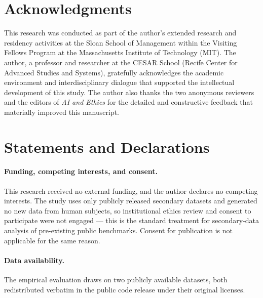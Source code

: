 \documentclass[11pt]{article}
\begin{document}
\section*{Acknowledgments}

This research was conducted as part of the author's extended research and residency activities at the Sloan School of Management within the Visiting Fellows Program at the Massachusetts Institute of Technology (MIT). The author, a professor and researcher at the CESAR School (Recife Center for Advanced Studies and Systems), gratefully acknowledges the academic environment and interdisciplinary dialogue that supported the intellectual development of this study. The author also thanks the two anonymous reviewers and the editors of \textit{AI and Ethics} for the detailed and constructive feedback that materially improved this manuscript.

\section*{Statements and Declarations}

\paragraph{Funding, competing interests, and consent.} This research received no external funding, and the author declares no competing interests. The study uses only publicly released secondary datasets and generated no new data from human subjects, so institutional ethics review and consent to participate were not engaged --- this is the standard treatment for secondary-data analysis of pre-existing public benchmarks. Consent for publication is not applicable for the same reason.

\paragraph{Data availability.} The empirical evaluation draws on two publicly available datasets, both redistributed verbatim in the public code release under their original licenses.
\end{document}
